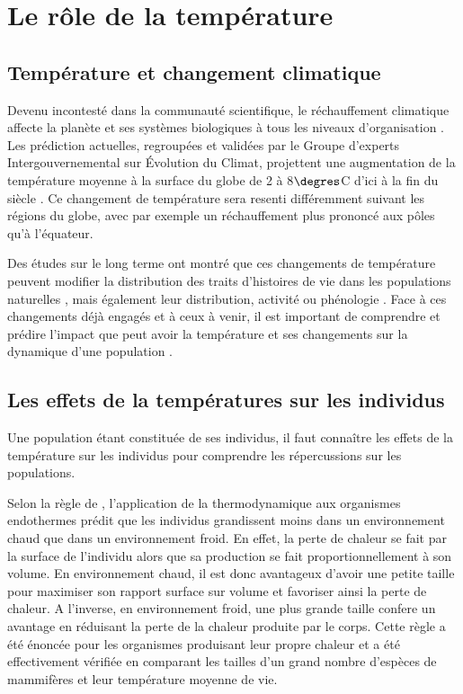 \section{Le rôle de la température}

\subsection{Température et changement climatique}

Devenu incontesté dans la communauté scientifique, le réchauffement climatique
affecte la planète et ses systèmes biologiques à tous les niveaux
d'organisation \autocites{sagarin1999a,sala2000a,ipcc2007a,walther2002a}. Les
prédiction actuelles, regroupées et validées par le Groupe d’experts
Intergouvernemental sur \'{E}volution du Climat, projettent une augmentation de
la température moyenne à la surface du globe de 2 à 8$\degres$C d'ici à la fin
du siècle \autocites{ipcc2007a}. Ce changement de température sera resenti
différemment suivant les régions du globe, avec par exemple un réchauffement
plus prononcé aux pôles qu'à l'équateur. 

Des études sur le long terme ont montré que ces changements de température
peuvent modifier la distribution des traits d'histoires de vie dans les
populations naturelles \autocites{parmesan2006a,ozgul2009a}, mais également leur
distribution, activité ou phénologie \autocites{parmesan2006a,walther2002a}.
Face à ces changements déjà engagés et à ceux à venir, il est important de
comprendre et prédire l'impact que peut avoir la température et ses changements
sur la dynamique d'une population \autocite{lavergne2010a}. 

\subsection{Les effets de la températures sur les individus}



Une population étant constituée de ses individus, il faut connaître les effets
de la température sur les individus pour comprendre les répercussions sur les
populations. 

Selon la règle de \textcites{bergmann1848a}, l'application de la thermodynamique
aux organismes endothermes prédit que les individus grandissent moins dans un
environnement chaud que dans un environnement froid. En effet, la perte de
chaleur se fait par la surface de l'individu alors que sa production se fait
proportionnellement à son volume. En environnement chaud, il est donc avantageux
d'avoir une petite taille pour maximiser son rapport surface sur volume et
favoriser ainsi la perte de chaleur. A l'inverse, en environnement froid, une
plus grande taille confere un avantage en réduisant la perte de la chaleur
produite par le corps. Cette règle a été énoncée pour les organismes produisant
leur propre chaleur et a été effectivement vérifiée en comparant les tailles
d'un grand nombre d'espèces de mammifères et leur température moyenne de vie. 

